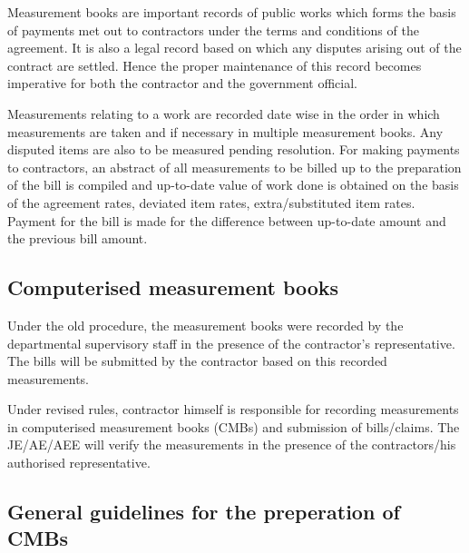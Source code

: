 \documentclass[twoside,a4paper]{refart}
\begin{document}
	 Measurement books are important records of public works which forms the basis of payments met out to contractors under the terms and conditions of the agreement. It is also a legal record based on which any disputes arising out of the contract are settled. Hence the proper maintenance of this record becomes imperative for both the contractor and the government official.
	 
	 Measurements relating to a work are recorded date wise in the order in which measurements are taken and if necessary in multiple measurement books. Any disputed items are also to be measured pending resolution. For making payments to contractors, an abstract of all measurements to be billed up to the preparation of the bill is compiled and up-to-date value of work done is obtained on the basis of the agreement rates, deviated item rates, extra/substituted item rates. Payment for the bill is made for the difference between up-to-date amount and the previous bill amount.
	 
	 \subsection{Computerised measurement books}
	 
	 Under the old procedure, the measurement books were recorded by the departmental supervisory staff in the presence of the contractor's representative. The bills will be submitted by the contractor based on this recorded measurements.
	 
	 Under revised rules, contractor himself is responsible for recording measurements in computerised measurement books (CMBs) and submission of bills/claims. The JE/AE/AEE will verify the measurements in the presence of the contractors/his authorised representative. 
	 
	 \subsection{General guidelines for the preperation of CMBs}
	 
\end{document}
